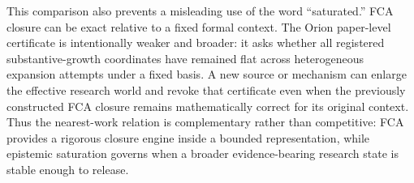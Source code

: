 This comparison also prevents a misleading use of the word ``saturated.'' FCA closure can be exact relative to a fixed formal context. The Orion paper-level certificate is intentionally weaker and broader: it asks whether all registered substantive-growth coordinates have remained flat across heterogeneous expansion attempts under a fixed basis. A new source or mechanism can enlarge the effective research world and revoke that certificate even when the previously constructed FCA closure remains mathematically correct for its original context. Thus the nearest-work relation is complementary rather than competitive: FCA provides a rigorous closure engine inside a bounded representation, while epistemic saturation governs when a broader evidence-bearing research state is stable enough to release.
